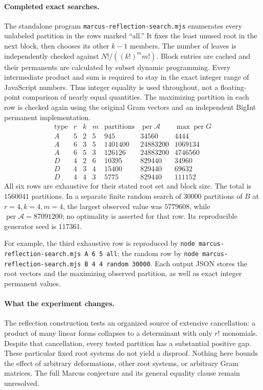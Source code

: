 \documentclass[11pt]{article}
\newcommand{\per}{\operatorname{per}}
\begin{document}
\paragraph{Completed exact searches.}
The standalone program \texttt{marcus-reflection-search.mjs} enumerates
every unlabeled partition in the rows marked ``all.'' It fixes the least
unused root in the next block, then chooses its other $k-1$ members.
The number of leaves is independently checked against
$N!/((k!)^m m!)$. Block entries are cached and their permanents are
calculated by subset dynamic programming. Every intermediate product and
sum is required to stay in the exact integer range of JavaScript numbers.
Thus integer equality is used throughout, not a floating-point comparison
of nearly equal quantities. The maximizing partition in each row is
checked again using the original Gram vectors and an independent BigInt
permanent implementation.
\[
\begin{array}{c|r|r|r|r|r|l}
 \text{type}&r&k&m&\text{partitions}&\per\mathcal A&\max\per G\\\hline
 A&5&2&5&945&34560&4444\\
 A&6&3&5&1401400&24883200&1069134\\
 A&6&5&3&126126&24883200&4746560\\
 D&4&2&6&10395&829440&34960\\
 D&4&3&4&15400&829440&69632\\
 D&4&4&3&5775&829440&111152
\end{array}
\]
All six rows are exhaustive for their stated root set and block size.
The total is $1560041$ partitions. In a separate finite random search of
$30000$ partitions of $B$ at $r=4,k=4,m=4$, the largest observed value
was $5779608$, while $\per\mathcal A=87091200$; no optimality is asserted
for that row. Its reproducible generator seed is $117361$.

For example, the third exhaustive row is reproduced by
\texttt{node marcus-reflection-search.mjs A 6 5 all}; the random row by
\texttt{node marcus-reflection-search.mjs B 4 4 random 30000}.
Each output JSON stores the root vectors and the maximizing observed
partition, as well as exact integer permanent values.

\paragraph{What the experiment changes.}
The reflection construction tests an organized source of extensive
cancellation: a product of many linear forms collapses to a determinant
with only $r!$ monomials. Despite that cancellation, every tested partition
has a substantial positive gap. These particular fixed root systems do
not yield a disproof. Nothing here bounds the effect of arbitrary
deformations, other root systems, or arbitrary Gram matrices. The full
Marcus conjecture and its general equality clause remain unresolved.
\end{document}
